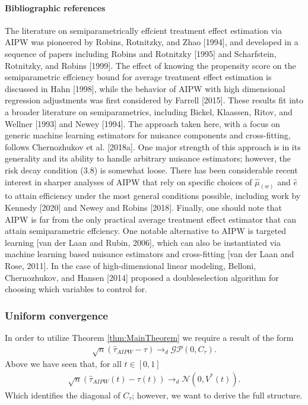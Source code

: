 \paragraph{Bibliographic references}

The literature on semiparametrically effcient treatment effect estimation via AIPW was
pioneered by Robins, Rotnitzky, and Zhao [1994], and developed in a sequence of papers
including Robins and Rotnitzky [1995] and Scharfstein, Rotnitzky, and Robins [1999]. The
effect of knowing the propensity score on the semiparametric effciency bound for average
treatment effect estimation is discussed in Hahn [1998], while the behavior of AIPW with
high dimensional regression adjustments was first considered by Farrell [2015]. These
results fit into a broader literature on semiparametrics, including Bickel, Klaassen,
Ritov, and Wellner [1993] and Newey [1994]. The approach taken here, with a focus on
generic machine learning estimators for nuisance components and cross-fitting, follows
Chernozhukov et al. [2018a]. One major strength of this approach is in its generality
and its ability to handle arbitrary nuisance estimators; however, the risk decay
condition (3.8) is somewhat loose. There has been considerable recent interest in
sharper analyses of AIPW that rely on specific choices of $\hat{\mu}_{(w)}$ and
$\hat{e}$ to attain efficiency under the most general conditions possible, including
work by Kennedy [2020] and Newey and Robins [2018]. Finally, one should note that AIPW
is far from the only practical average treatment effect estimator that can attain
semiparametric effciency. One notable alternative to AIPW is targeted learning [van der
Laan and Rubin, 2006], which can also be instantiated via machine learning based
nuisance estimators and cross-fitting [van der Laan and Rose, 2011]. In the case of
high-dimensional linear modeling, Belloni, Chernozhukov, and Hansen [2014] proposed a
doubleselection algorithm for choosing which variables to control for.


\subsubsection{Uniform convergence}

In order to utilize Theorem \ref{thm:MainTheorem} we require a result of the form
\begin{align}
    \sqrt{n} (\hat{\tau}_{AIPW} - \tau) \to_d \mathcal{GP}(0, C_\tau).
\end{align}
Above we have seen that, for all $t \in [0, 1]$
\begin{align}
    \sqrt{n} (\hat{\tau}_{AIPW}(t) - \tau(t)) \to_d \mathcal{N}(0, V^\ast(t)).
\end{align}
Which identifies the diagonal of $C_\tau$; however, we want to derive the full
structure.

